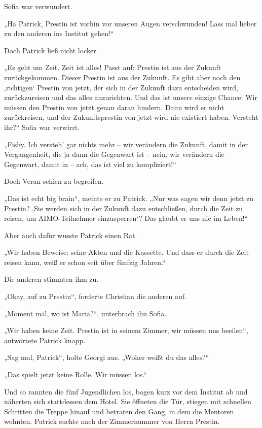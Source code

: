 \documentclass[oneside]{memoir}
\begin{document}
Sofia war verwundert.

„Hä Patrick, Prestin ist vorhin vor unseren Augen verschwunden! Lass mal lieber zu den anderen ins Institut gehen!“

Doch Patrick ließ nicht locker.

„Es geht um Zeit. Zeit ist alles! Passt auf: Prestin ist aus der Zukunft zurückgekommen. Dieser Prestin ist aus der Zukunft. Es gibt aber noch den ‚richtigen‘ Prestin von jetzt, der sich in der Zukunft dazu entscheiden wird, zurückzureisen und das alles anzurichten. Und das ist unsere einzige Chance: Wir müssen den Prestin von jetzt genau daran hindern. Dann wird er nicht zurückreisen, und der Zukunftsprestin von jetzt wird nie existiert haben. Versteht ihr?“
Sofia war verwirrt.

„Fishy. Ich versteh' gar nichts mehr – wir verändern die Zukunft, damit in der Vergangenheit, die ja dann die Gegenwart ist – nein, wir verändern die Gegenwart, damit in – ach, das ist viel zu kompliziert!“

Doch Veran schien zu begreifen.

„Das ist echt big brain“, meinte er zu Patrick. „Nur was sagen wir denn jetzt zu Prestin? ‚Sie werden sich in der Zukunft dazu entschließen, durch die Zeit zu reisen, um AIMO-Teilnehmer einzusperren‘? Das glaubt er uns nie im Leben!“

Aber auch dafür wusste Patrick einen Rat.

„Wir haben Beweise: seine Akten und die Kassette. Und dass er durch die Zeit reisen kann, weiß er schon seit über fünfzig Jahren.“

Die anderen stimmten ihm zu.

„Okay, auf zu Prestin“, forderte Christian die anderen auf.

„Moment mal, wo ist Maria?“, unterbrach ihn Sofia.

„Wir haben keine Zeit. Prestin ist in seinem Zimmer, wir müssen uns beeilen“, antwortete Patrick knapp.

„Sag mal, Patrick“, holte Georgi aus. „Woher weißt du das alles?“

„Das spielt jetzt keine Rolle. Wir müssen los.“

Und so rannten die fünf Jugendlichen los, bogen kurz vor dem Institut ab und näherten sich stattdessen dem Hotel. Sie öffneten die Tür, stiegen mit schnellen Schritten die Treppe hinauf und betraten den Gang, in dem die Mentoren wohnten. Patrick suchte nach der Zimmernummer von Herrn Prestin.
\end{document}
